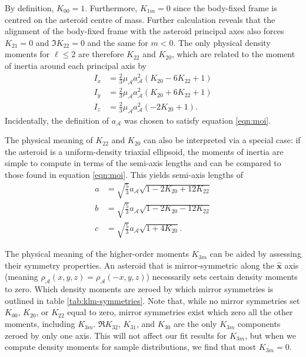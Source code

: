 \documentclass[fleqn,usenatbib]{mnras}
\newcommand{\unit}[1]{\bm{\hat{#1}}}
\newcommand{\parens}[1]{\left( #1 \right)}
\begin{document}
By definition, $K_{00}=1$. Furthermore, $K_{1m} = 0$ since the body-fixed frame is centred on the asteroid centre of mass. Further calculation reveals that the alignment of the body-fixed frame with the asteroid principal axes also forces $K_{21}= 0$ and $\Im K_{22}=0$ and the same for $m<0$. The only physical density moments for $\ell \leq 2$ are therefore $K_{22}$ and $K_{20}$, which are related to the moment of inertia around each principal axis by
\begin{equation}
  \begin{split}
    I_x &= \frac{2}{3}\mu_\mathcal{A} a_\mathcal{A}^2 \parens{K_{20} - 6 K_{22} + 1}\\
    I_y &= \frac{2}{3}\mu_\mathcal{A} a_\mathcal{A}^2 \parens{K_{20} + 6 K_{22} + 1}\\
    I_z &= \frac{2}{3}\mu_\mathcal{A} a_\mathcal{A}^2 \parens{-2K_{20} + 1}.
  \end{split}
  \label{eqn:moi}
\end{equation}
Incidentally, the definition of $a_\mathcal{A}$ was chosen to satisfy equation \ref{eqn:moi}.

The physical meaning of $K_{22}$ and $K_{20}$ can also be interpreted via a special case: if the asteroid is a uniform-density triaxial ellipsoid, the moments of inertia are simple to compute in terms of the semi-axis lengths and can be compared to those found in equation \ref{eqn:moi}. This yields semi-axis lengths of 
\begin{equation}
  \begin{split}
  a &= \sqrt{\frac{5}{3}}a_\mathcal{A}\sqrt{1-2K_{20}+12K_{22}}\\
  b &= \sqrt{\frac{5}{3}}a_\mathcal{A}\sqrt{1-2K_{20}-12K_{22}}\\
  c &= \sqrt{\frac{5}{3}}a_\mathcal{A}\sqrt{1+4K_{20}}.
  \label{eqn:ellipsoid-axes}
  \end{split}
\end{equation}

The physical meaning of the higher-order moments $K_{3m}$ can be aided by assessing their symmetry properties. An asteroid that is mirror-symmetric along the $\unit{x}$ axis (meaning $\rho_\mathcal{A}(x,y,z)=\rho_\mathcal{A}(-x,y,z)$) necessarily sets certain density moments to zero. Which density moments are zeroed by which mirror symmetries is outlined in table \ref{tab:klm-symmetries}. Note that, while no mirror symmetries set $K_{00}$, $K_{20}$, or $K_{22}$ equal to zero, mirror symmetries exist which zero all the other moments, including $K_{3m}$. $\Re K_{32}$, $K_{31}$, and $K_{30}$ are the only $K_{3m}$ components zeroed by only one axis. This will not affect our fit results for $K_{3m}$, but when we compute density moments for sample distributions, we find that most $K_{3m}=0$.
\end{document}

